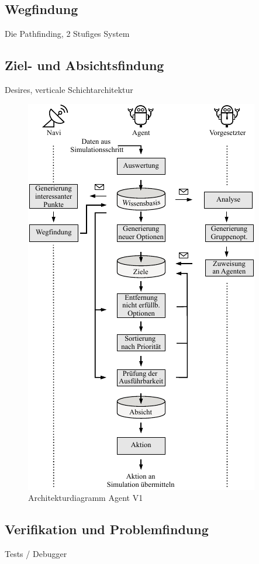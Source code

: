 \documentclass[runningheads]{llncs}
\begin{document}
\subsection{Wegfindung}\label{wegfindung}
Die 
Pathfinding, 2 Stufiges System

\subsection{Ziel- und Absichtsfindung}\label{absichtsfindung}
Desires, verticale Schichtarchitektur

\begin{figure}
\includegraphics{./Referenzen/Entscheidungsfindung.pdf}
\caption{Architekturdiagramm Agent V1}
\label{g3:architecture}
\end{figure}

\subsection{Verifikation und Problemfindung}\label{verifikation}
Tests / Debugger
\end{document}
